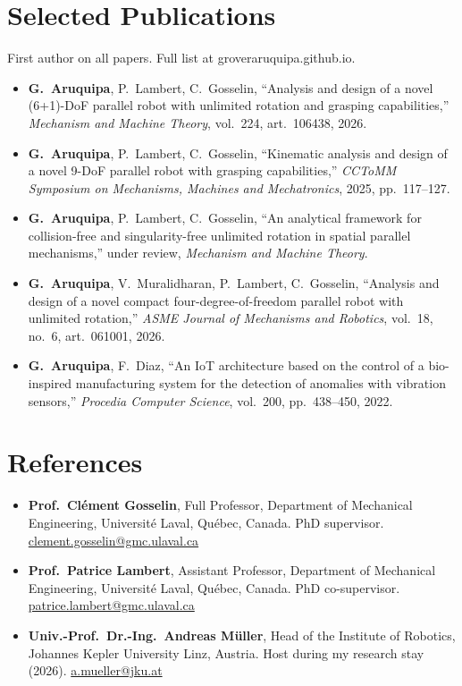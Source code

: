 \documentclass[10pt,letterpaper]{article}
\begin{document}
\newpage
\section{Selected Publications}
{\small First author on all papers. Full list at groveraruquipa.github.io.}\par\vspace{2pt}
\begin{itemize}
\item \textbf{G.~Aruquipa}, P.~Lambert, C.~Gosselin, ``Analysis and design of a novel (6+1)-DoF parallel robot with unlimited rotation and grasping capabilities,'' \emph{Mechanism and Machine Theory}, vol.~224, art.~106438, 2026.
\item \textbf{G.~Aruquipa}, P.~Lambert, C.~Gosselin, ``Kinematic analysis and design of a novel 9-DoF parallel robot with grasping capabilities,'' \emph{CCToMM Symposium on Mechanisms, Machines and Mechatronics}, 2025, pp.~117--127.
\item \textbf{G.~Aruquipa}, P.~Lambert, C.~Gosselin, ``An analytical framework for collision-free and singularity-free unlimited rotation in spatial parallel mechanisms,'' under review, \emph{Mechanism and Machine Theory}.
\item \textbf{G.~Aruquipa}, V.~Muralidharan, P.~Lambert, C.~Gosselin, ``Analysis and design of a novel compact four-degree-of-freedom parallel robot with unlimited rotation,'' \emph{ASME Journal of Mechanisms and Robotics}, vol.~18, no.~6, art.~061001, 2026.
\item \textbf{G.~Aruquipa}, F.~Diaz, ``An IoT architecture based on the control of a bio-inspired manufacturing system for the detection of anomalies with vibration sensors,'' \emph{Procedia Computer Science}, vol.~200, pp.~438--450, 2022.
\end{itemize}

\section{References}
\begin{itemize}
\item \textbf{Prof.~Cl\'ement Gosselin}, Full Professor, Department of Mechanical Engineering, Universit\'e Laval, Qu\'ebec,
Canada. PhD supervisor. \href{mailto:clement.gosselin@gmc.ulaval.ca}{clement.gosselin@gmc.ulaval.ca}
\item \textbf{Prof.~Patrice Lambert}, Assistant Professor, Department of Mechanical Engineering, Universit\'e Laval,
Qu\'ebec, Canada. PhD co-supervisor. \href{mailto:patrice.lambert@gmc.ulaval.ca}{patrice.lambert@gmc.ulaval.ca}
\item \textbf{Univ.-Prof.~Dr.-Ing.~Andreas M\"uller}, Head of the Institute of Robotics, Johannes Kepler University Linz,
Austria. Host during my research stay (2026). \href{mailto:a.mueller@jku.at}{a.mueller@jku.at}
\end{itemize}
\end{document}
